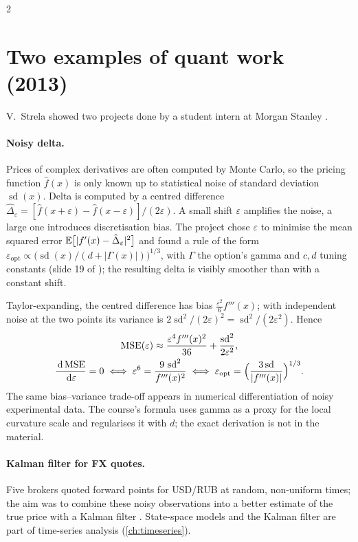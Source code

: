\begin{paracol}{2}
\section{Two examples of quant work (2013)}\label{sec:projects}
V.~Strela showed two projects done by a student intern at Morgan Stanley .

\paragraph{Noisy delta.} Prices of complex derivatives are often computed by Monte Carlo, so the
pricing function $\hat f(x)$ is only known up to statistical noise of standard deviation
$\operatorname{sd}(x)$. Delta is computed by a centred difference
$\hat\Delta_\varepsilon = [\hat f(x+\varepsilon)-\hat f(x-\varepsilon)]/(2\varepsilon)$. A small shift
$\varepsilon$ amplifies the noise, a large one introduces discretisation bias. The project chose
$\varepsilon$ to minimise the mean squared error $\mathbb{E}\bigl[|f'(x)-\hat\Delta_\varepsilon|^2\bigr]$ and found
a rule of the form $\varepsilon_{\text{opt}} \propto \bigl(\operatorname{sd}(x)/(d+|\Gamma(x)|)\bigr)^{1/3}$,
with $\Gamma$ the option's gamma and $c,d$ tuning constants (slide 19 of ); the resulting
delta is visibly smoother than with a constant shift.

\begin{intuition}
Taylor-expanding, the centred difference has bias $\frac{\varepsilon^2}{6}f'''(x)$; with independent
noise at the two points its variance is $2\operatorname{sd}^2/(2\varepsilon)^2 = \operatorname{sd}^2/(2\varepsilon^2)$.
Hence
\begin{gather*}
  \mathrm{MSE}(\varepsilon) \approx \frac{\varepsilon^4 f'''(x)^2}{36} + \frac{\operatorname{sd}^2}{2\varepsilon^2},\\
  \frac{\,\mathrm{d}\,\mathrm{MSE}}{\,\mathrm{d}\varepsilon}=0 \iff \varepsilon^6 = \frac{9\,\operatorname{sd}^2}{f'''(x)^2}
  \iff \varepsilon_{\text{opt}} = \Bigl(\frac{3\operatorname{sd}}{|f'''(x)|}\Bigr)^{1/3}.
\end{gather*}
The same bias--variance trade-off appears in numerical differentiation of noisy experimental data.
The course's formula uses gamma as a proxy for the local curvature scale and regularises it with $d$;
the exact derivation is not in the material.
\end{intuition}

\paragraph{Kalman filter for FX quotes.} Five brokers quoted forward points for USD/RUB at random,
non-uniform times; the aim was to combine these noisy observations into a better estimate of the true
price with a Kalman filter . State-space models and the Kalman filter are part of
time-series analysis (\cref{ch:timeseries}).


\end{paracol}
